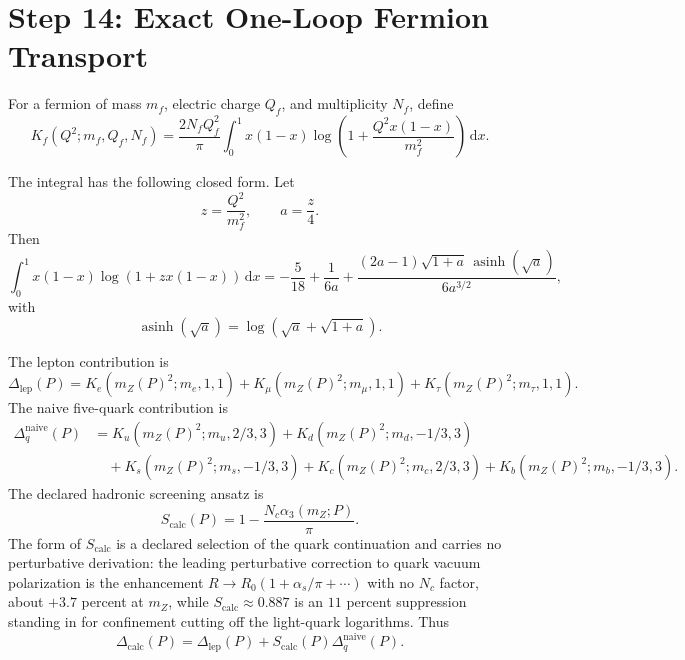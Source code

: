 \documentclass[11pt]{article}
\theoremstyle{remark}
\newcommand{\dd}{\,\mathrm d}
\newcommand{\Dcalc}{\Delta_{\mathrm{calc}}}
\newcommand{\Dlep}{\Delta_{\mathrm{lep}}}
\newcommand{\Nc}{N_c}
\begin{document}
\section{Step 14: Exact One-Loop Fermion Transport}

For a fermion of mass \(m_f\), electric charge \(Q_f\), and multiplicity \(N_f\), define
\begin{equation}
K_f(Q^2;m_f,Q_f,N_f)
=
\frac{2N_fQ_f^2}{\pi}
\int_0^1 x(1-x)
\log\!\left(1+\frac{Q^2x(1-x)}{m_f^2}\right)\dd x.
\label{eq:kernelint}
\end{equation}

The integral has the following closed form. Let
\begin{equation}
z=\frac{Q^2}{m_f^2},
\qquad
a=\frac{z}{4}.
\end{equation}
Then
\begin{equation}
\int_0^1 x(1-x)\log(1+zx(1-x))\dd x
=
-\frac{5}{18}
+\frac{1}{6a}
+\frac{(2a-1)\sqrt{1+a}\,\operatorname{asinh}(\sqrt a)}
{6a^{3/2}},
\label{eq:kernelclosed}
\end{equation}
with
\begin{equation}
\operatorname{asinh}(\sqrt a)
=
\log(\sqrt a+\sqrt{1+a}).
\end{equation}

The lepton contribution is
\begin{equation}
\Dlep(P)=
K_e(m_Z(P)^2;m_e,1,1)
+K_\mu(m_Z(P)^2;m_\mu,1,1)
+K_\tau(m_Z(P)^2;m_\tau,1,1).
\label{eq:Dlep}
\end{equation}
The naive five-quark contribution is
\begin{align}
\Delta_q^{\mathrm{naive}}(P)
&=
K_u(m_Z(P)^2;m_u,2/3,3)
+K_d(m_Z(P)^2;m_d,-1/3,3)
\nonumber\\
&\quad
+K_s(m_Z(P)^2;m_s,-1/3,3)
+K_c(m_Z(P)^2;m_c,2/3,3)
+K_b(m_Z(P)^2;m_b,-1/3,3).
\label{eq:Dqnaive}
\end{align}
The declared hadronic screening ansatz is
\begin{equation}
S_{\mathrm{calc}}(P)=
1-\frac{\Nc\alpha_3(m_Z;P)}{\pi}.
\label{eq:Scalc}
\end{equation}
The form of \(S_{\mathrm{calc}}\) is a declared selection of the quark
continuation and carries no perturbative derivation: the leading perturbative
correction to quark vacuum polarization is the enhancement
\(R\to R_0(1+\alpha_s/\pi+\cdots)\) with no \(\Nc\) factor, about \(+3.7\)
percent at \(m_Z\), while \(S_{\mathrm{calc}}\approx0.887\) is an \(11\)
percent suppression standing in for confinement cutting off the light-quark
logarithms.
Thus
\begin{equation}
\Dcalc(P)
=
\Dlep(P)+S_{\mathrm{calc}}(P)\Delta_q^{\mathrm{naive}}(P).
\label{eq:Dcalc}
\end{equation}
\end{document}
